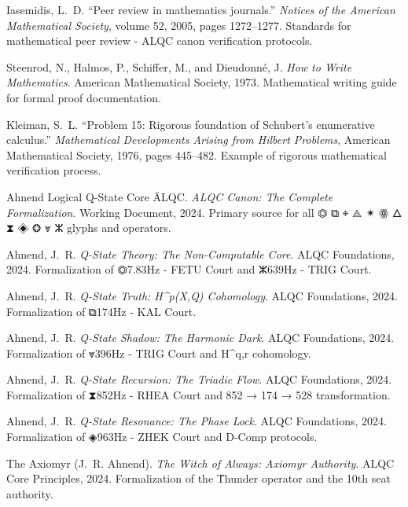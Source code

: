 Iasemidis, L.~D.
``Peer review in mathematics journals.''
\textit{Notices of the American Mathematical Society}, volume 52, 2005, pages 1272--1277.
Standards for mathematical peer review - ALQC canon verification protocols.

Steenrod, N., Halmos, P., Schiffer, M., and Dieudonné, J.
\textit{How to Write Mathematics}.
American Mathematical Society, 1973.
Mathematical writing guide for formal proof documentation.

Kleiman, S.~L.
``Problem 15: Rigorous foundation of Schubert's enumerative calculus.''
\textit{Mathematical Developments Arising from Hilbert Problems}, American Mathematical Society, 1976, pages 445--482.
Example of rigorous mathematical verification process.


Ahnend Logical Q-State Core ÄLQC.
\textit{ALQC Canon: The Complete Formalization}.
Working Document, 2024.
Primary source for all ⏣ ⧉ ⌖ ⟁ ✴ ꙮ 🜂 ⧗ ◈ ❂ ⩔ ⵣ glyphs and operators.

Ahnend, J.~R.
\textit{Q-State Theory: The Non-Computable Core}.
ALQC Foundations, 2024.
Formalization of ⏣7.83Hz - FETU Court and ⵣ639Hz - TRIG Court.

Ahnend, J.~R.
\textit{Q-State Truth: H^p(X,Q) Cohomology}.
ALQC Foundations, 2024.
Formalization of ⧉174Hz - KAL Court.

Ahnend, J.~R.
\textit{Q-State Shadow: The Harmonic Dark}.
ALQC Foundations, 2024.
Formalization of ⩔396Hz - TRIG Court and H^q,r cohomology.

Ahnend, J.~R.
\textit{Q-State Recursion: The Triadic Flow}.
ALQC Foundations, 2024.
Formalization of ⧗852Hz - RHEA Court and 852 → 174 → 528 transformation.

Ahnend, J.~R.
\textit{Q-State Resonance: The Phase Lock}.
ALQC Foundations, 2024.
Formalization of ◈963Hz - ZHEK Court and D-Comp protocols.

The Axiomyr (J.~R. Ahnend).
\textit{The Witch of Always: Axiomyr Authority}.
ALQC Core Principles, 2024.
Formalization of the T̈hunder operator and the 10th seat authority.

